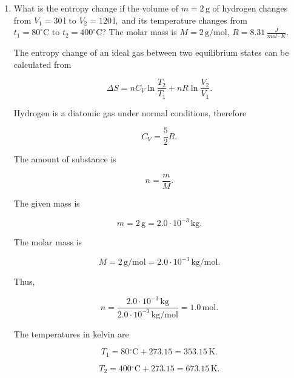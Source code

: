 \documentclass[letterpaper,12pt]{letter}
\begin{document}
\begin{enumerate}[label=\Roman*.]
\begin{enumerate}[label=\arabic*.]

\pagebreak
\item What is the entropy change if the volume of $ m = 2\,\mathrm{g} $ of hydrogen changes from $ V_1 = 30\,\mathrm{l} \text{\ to\ } V_2 = 120\,\mathrm{l},$ and its temperature changes from $t_1 = 80^\circ\mathrm{C} \text{\ to\ } t_2 = 400^\circ\mathrm{C}$? The molar mass is $ M = 2\,\mathrm{g/mol}$, $R=8.31\,\frac{J}{mol\cdot K}$.

\bigskip

\begin{center}
\end{center}

The entropy change of an ideal gas between two equilibrium states can be calculated from

$$\Delta S=nC_V\ln\frac{T_2}{T_1}+nR\ln\frac{V_2}{V_1}.$$

Hydrogen is a diatomic gas under normal conditions, therefore

$$C_V=\frac{5}{2}R.$$

The amount of substance is

$$n=\frac{m}{M}.$$

The given mass is

$$m=2\,\mathrm{g}=2.0\cdot10^{-3}\,\mathrm{kg}.$$

The molar mass is

$$M=2\,\mathrm{g/mol}=2.0\cdot10^{-3}\,\mathrm{kg/mol}.$$

Thus,

$$n=\frac{2.0\cdot10^{-3}\,\mathrm{kg}}{2.0\cdot10^{-3}\,\mathrm{kg/mol}}=1.0\,\mathrm{mol}.$$

The temperatures in kelvin are

$$T_1=80{}^\circ\mathrm{C}+273.15=353.15\,\mathrm{K}.$$

$$T_2=400{}^\circ\mathrm{C}+273.15=673.15\,\mathrm{K}.$$


\end{enumerate}
\end{enumerate}
\end{document}

